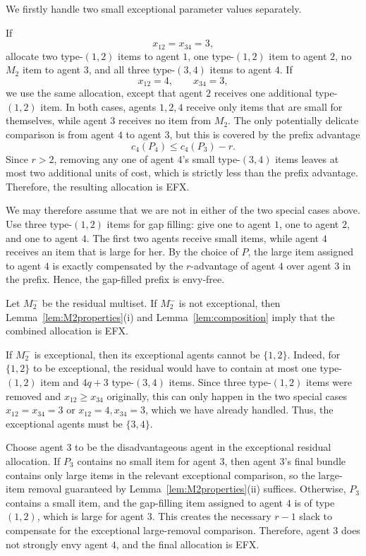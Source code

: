 \documentclass{article}
\theoremstyle{definition}
\begin{document}
We firstly handle two small exceptional parameter values separately.

If
\[
    x_{12}=x_{34}=3,
\]
allocate two type-$(1,2)$ items to agent $1$, one type-$(1,2)$ item to agent
$2$, no $M_2$ item to agent $3$, and all three type-$(3,4)$ items to agent
$4$.  If
\[
    x_{12}=4,\qquad x_{34}=3,
\]
we use the same allocation, except that agent $2$ receives one additional
type-$(1,2)$ item.  In both cases, agents $1,2,4$ receive only items that are
small for themselves, while agent $3$ receives no item from $M_2$.  The only
potentially delicate comparison is from agent $4$ to agent $3$, but this is
covered by the prefix advantage
\[
    c_4(P_4)\le c_4(P_3)-r.
\]
Since $r>2$, removing any one of agent $4$'s small type-$(3,4)$ items leaves
at most two additional units of cost, which is strictly less than the prefix
advantage.  Therefore, the resulting allocation is EFX.

We may therefore assume that we are not in either of the two special cases
above.  Use three type-$(1,2)$ items for gap filling: give one to agent $1$,
one to agent $2$, and one to agent $4$.  The first two agents receive small
items, while agent $4$ receives an item that is large for her.  By the choice
of $P$, the large item assigned to agent $4$ is exactly compensated by the
$r$-advantage of agent $4$ over agent $3$ in the prefix.  Hence, the
gap-filled prefix is envy-free.

Let $M_2^-$ be the residual multiset.  If $M_2^-$ is not exceptional, then
Lemma~\ref{lem:M2properties}(i) and Lemma~\ref{lem:composition} imply that the
combined allocation is EFX.

If $M_2^-$ is exceptional, then its exceptional agents cannot be $\{1,2\}$.
Indeed, for $\{1,2\}$ to be exceptional, the residual would have to contain
at most one type-$(1,2)$ item and $4q+3$ type-$(3,4)$ items.  Since three
type-$(1,2)$ items were removed and $x_{12}\ge x_{34}$ originally, this can
only happen in the two special cases $x_{12}=x_{34}=3$ or
$x_{12}=4,x_{34}=3$, which we have already handled.  Thus, the exceptional
agents must be $\{3,4\}$.

Choose agent $3$ to be the disadvantageous agent in the exceptional residual
allocation.  If $P_3$ contains no small item for agent $3$, then agent $3$'s
final bundle contains only large items in the relevant exceptional comparison,
so the large-item removal guaranteed by Lemma~\ref{lem:M2properties}(ii)
suffices.  Otherwise, $P_3$ contains a small item, and the gap-filling item
assigned to agent $4$ is of type $(1,2)$, which is large for agent $3$.
This creates the necessary $r-1$ slack to compensate for the exceptional
large-removal comparison.  Therefore, agent $3$ does not strongly envy agent
$4$, and the final allocation is EFX.
\end{document}
